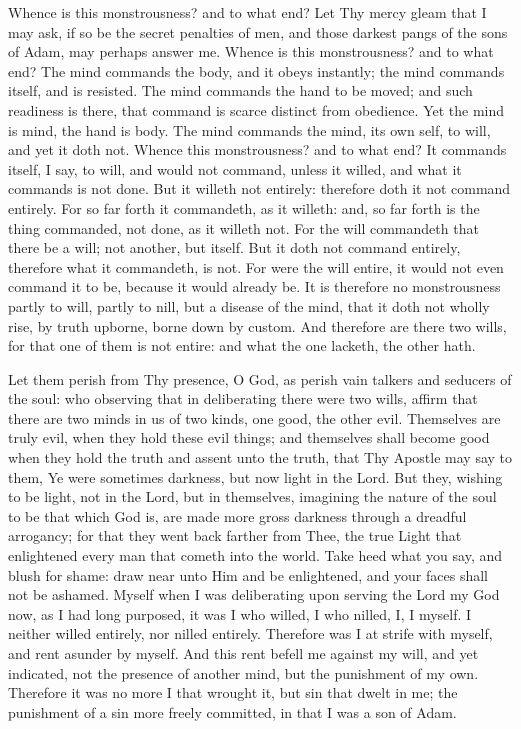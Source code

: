 \documentclass[b5paper,openright,12pt,twoside]{book}
\begin{document}
Whence is this monstrousness? and to what end? Let Thy mercy gleam that
I may ask, if so be the secret penalties of men, and those darkest
pangs of the sons of Adam, may perhaps answer me. Whence is this
monstrousness? and to what end? The mind commands the body, and it obeys
instantly; the mind commands itself, and is resisted. The mind commands
the hand to be moved; and such readiness is there, that command is
scarce distinct from obedience. Yet the mind is mind, the hand is body.
The mind commands the mind, its own self, to will, and yet it doth not.
Whence this monstrousness? and to what end? It commands itself, I say,
to will, and would not command, unless it willed, and what it commands
is not done. But it willeth not entirely: therefore doth it not command
entirely. For so far forth it commandeth, as it willeth: and, so far
forth is the thing commanded, not done, as it willeth not. For the will
commandeth that there be a will; not another, but itself. But it doth
not command entirely, therefore what it commandeth, is not. For were
the will entire, it would not even command it to be, because it would
already be. It is therefore no monstrousness partly to will, partly to
nill, but a disease of the mind, that it doth not wholly rise, by truth
upborne, borne down by custom. And therefore are there two wills, for
that one of them is not entire: and what the one lacketh, the other
hath.

Let them perish from Thy presence, O God, as perish vain talkers and
seducers of the soul: who observing that in deliberating there were two
wills, affirm that there are two minds in us of two kinds, one good, the
other evil. Themselves are truly evil, when they hold these evil things;
and themselves shall become good when they hold the truth and assent
unto the truth, that Thy Apostle may say to them, Ye were sometimes
darkness, but now light in the Lord. But they, wishing to be light, not
in the Lord, but in themselves, imagining the nature of the soul to
be that which God is, are made more gross darkness through a dreadful
arrogancy; for that they went back farther from Thee, the true Light
that enlightened every man that cometh into the world. Take heed what
you say, and blush for shame: draw near unto Him and be enlightened,
and your faces shall not be ashamed. Myself when I was deliberating
upon serving the Lord my God now, as I had long purposed, it was I who
willed, I who nilled, I, I myself. I neither willed entirely, nor nilled
entirely. Therefore was I at strife with myself, and rent asunder by
myself. And this rent befell me against my will, and yet indicated, not
the presence of another mind, but the punishment of my own. Therefore it
was no more I that wrought it, but sin that dwelt in me; the punishment
of a sin more freely committed, in that I was a son of Adam.
\end{document}
